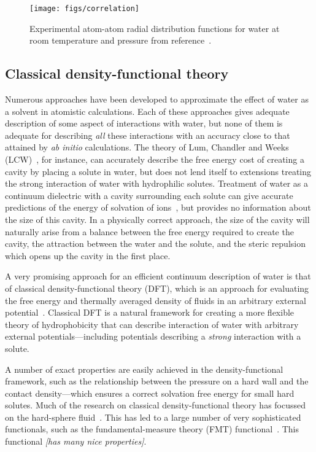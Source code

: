 \documentclass[letterpaper,twocolumn,amsmath,amssymb,prb]{revtex4-1}
\newcommand{\needsworklater}[1]{\emph{[#1]}}
\begin{document}
\begin{figure}
\texttt{[image: figs/correlation]}
\caption{ Experimental atom-atom radial distribution functions for water at
room temperature and pressure from reference~\cite{Soper2000}.  }
\label{correlation}
\end{figure}

\subsection{Classical density-functional theory}

Numerous approaches have been developed to approximate the effect of water
as a solvent in atomistic calculations.  Each of these approaches gives
adequate description of some aspect of interactions with water, but none of
them is adequate for describing \emph{all} these interactions with an
accuracy close to that attained by \emph{ab initio} calculations.  The
theory of Lum, Chandler and Weeks (LCW)~\cite{LCW}, for instance, can
accurately describe the free energy cost of creating a cavity by placing a
solute in water, but does not lend itself to extensions treating the strong
interaction of water with hydrophilic solutes.  Treatment of water as a
continuum dielectric with a cavity surrounding each solute can give
accurate predictions of the energy of solvation of ions~\cite{latimer1939,
rashin1985, zhan1998, hsu1999, hildebrandt2004, hildebrandt2007}, but
provides no information about the size of this cavity.  In a physically
correct approach, the size of the cavity will naturally arise from a
balance between the free energy required to create the cavity, the
attraction between the water and the solute, and the steric repulsion which
opens up the cavity in the first place.

A very promising approach for an efficient continuum description of water
is that of classical density-functional theory (DFT), which is an approach
for evaluating the free energy and thermally averaged density of fluids in
an arbitrary external potential~\cite{ebner1976}.  Classical DFT is a
natural framework for creating a more flexible theory of hydrophobicity
that can describe interaction of water with arbitrary external
potentials---including potentials describing a \emph{strong} interaction
with a solute.

A number of exact properties are easily achieved in the density-functional
framework, such as the relationship between the pressure on a hard wall and
the contact density---which ensures a correct solvation free energy for
small hard solutes.  Much of the research on classical density-functional
theory has focussed on the hard-sphere fluid~\cite{curtin1985,
rosenfeld1989, rosenfeld1993, rosenfeld1997, tarazona1997, tarazona2000}.
This has led to a large number of very sophisticated functionals, such as
the fundamental-measure theory (FMT) functional~\cite{rosenfeld1989,
rosenfeld1993, rosenfeld1997, tarazona1997, tarazona2000}.  This functional
\needsworklater{has many nice properties}.
\end{document}
